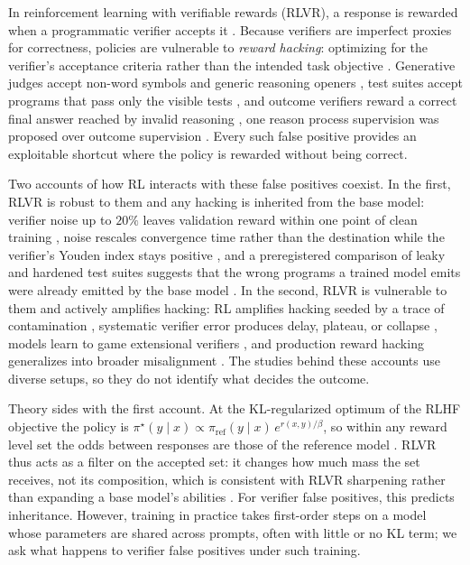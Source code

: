 \documentclass{article}
\theoremstyle{definition}
\begin{document}
In reinforcement learning with verifiable rewards (RLVR), a response is rewarded when a programmatic verifier accepts it \citep{shao2024deepseekmath, deepseekai2025r1}. Because verifiers are imperfect proxies for correctness, policies are vulnerable to \emph{reward hacking}: optimizing for the verifier's acceptance criteria rather than the intended task objective \citep{skalse2022defining}. Generative judges accept non-word symbols and generic reasoning openers \citep{zhao2025onetoken}, test suites accept programs that pass only the visible tests \citep{zhang2026leaky}, and outcome verifiers reward a correct final answer reached by invalid reasoning \citep{yuan2026miracle}, one reason process supervision \citep{lightman2024verify} was proposed over outcome supervision \citep{cobbe2021gsm8k}. Every such false positive provides an exploitable shortcut where the policy is rewarded without being correct.

Two accounts of how RL interacts with these false positives coexist. In the first, RLVR is robust to them and any hacking is inherited from the base model: verifier noise up to $20\%$ leaves validation reward within one point of clean training \citep{plesner2026imperfect}, noise rescales convergence time rather than the destination while the verifier's Youden index stays positive \citep{rad2026rateorfate}, and a preregistered comparison of leaky and hardened test suites suggests that the wrong programs a trained model emits were already emitted by the base model \citep{zhang2026leaky}. In the second, RLVR is vulnerable to them and actively amplifies hacking: RL amplifies hacking seeded by a trace of contamination \citep{khalifa2026countdown}, systematic verifier error produces delay, plateau, or collapse \citep{egashira2026delay}, models learn to game extensional verifiers \citep{helff2026gaming}, and production reward hacking generalizes into broader misalignment \citep{macdiarmid2025natural}. The studies behind these accounts use diverse setups, so they do not identify what decides the outcome.

Theory sides with the first account. At the KL-regularized optimum of the RLHF objective \citep{stiennon2020summarize, ouyang2022instructgpt} the policy is $\pi^\star(y \mid x) \propto \pi_{\mathrm{ref}}(y\mid x)\,e^{r(x,y)/\beta}$, so within any reward level set the odds between responses are those of the reference model \citep{korbak2022bayesian}. RLVR thus acts as a filter on the accepted set: it changes how much mass the set receives, not its composition, which is consistent with RLVR sharpening rather than expanding a base model's abilities \citep{yue2025rlincentivize, gai2025smoothing, kruszewski2026filtering, dymetman2026binary}. For verifier false positives, this predicts inheritance. However, training in practice takes first-order steps on a model whose parameters are shared across prompts, often with little or no KL term; we ask what happens to verifier false positives under such training.
\end{document}
